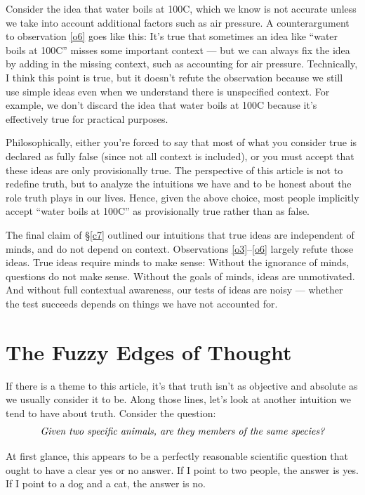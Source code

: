 \documentclass[11pt, oneside]{article}
\begin{document}
Consider the idea that water boils at
100\degree C, which we know is not accurate unless we take into account
additional factors such as air pressure.
A counterargument to observation \ref{o6} goes like this:
It's true that sometimes an idea like ``water boils at 100\degree C'' misses
some important context --- but we can always fix the idea by adding in the
missing context, such as accounting for air pressure.
Technically, I think this point is true, but
it doesn't refute the observation because we still use simple
ideas even when we understand there is unspecified context.
For example, we don't discard the idea that water boils at 100\degree C because
it's effectively true for practical purposes.

Philosophically, either you're
forced to say that
most of what you consider true is declared as fully false (since not
all context is included), or you must accept that these ideas are only
provisionally true.
The perspective of this article is not to redefine truth, but to analyze the
intuitions we have and to be honest about the role truth plays in our lives.
Hence, given the above choice, most people
implicitly accept
``water boils at 100\degree C'' as
provisionally true rather than as false.

The final claim of \S\ref{c7}
outlined our intuitions that true ideas are independent
of minds, and do not depend on context.
Observations \ref{o3}--\ref{o6} largely refute those ideas.
True ideas require minds to make sense:
Without the ignorance of minds, questions do not make sense.
Without the goals of minds, ideas are unmotivated.
And without full contextual awareness, our tests of ideas are noisy ---
whether the test succeeds depends on things we have not accounted
for.

\section{The Fuzzy Edges of Thought}

If there is a theme to this article, it's that truth isn't as
objective and absolute as we usually consider it to be.
Along those lines, let's
look at another intuition we tend to have about truth.
Consider the question:
\begin{equation*}\label{eq4}
    \text{\em Given two specific animals, are they members of the same
    species?}
\end{equation*}

At first glance, this appears to be a perfectly reasonable scientific question
that ought to have a clear yes or no answer. If I point to two people, the
answer is yes. If I point to a dog and a cat, the answer is no.
\end{document}
